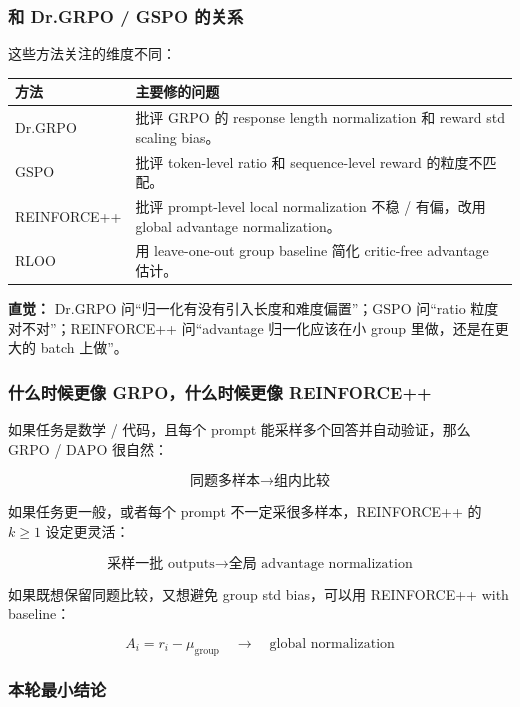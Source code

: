 \subsubsection{和 Dr.GRPO / GSPO 的关系}

这些方法关注的维度不同：

\begin{center}
{\small
\begin{tabular}{p{3cm}p{9.5cm}}
\hline
\textbf{方法} & \textbf{主要修的问题} \\
\hline
Dr.GRPO
&
批评 GRPO 的 response length normalization 和 reward std scaling bias。
\\
GSPO
&
批评 token-level ratio 和 sequence-level reward 的粒度不匹配。
\\
REINFORCE++
&
批评 prompt-level local normalization 不稳 / 有偏，改用 global advantage normalization。
\\
RLOO
&
用 leave-one-out group baseline 简化 critic-free advantage 估计。
\\
\hline
\end{tabular}
}
\end{center}

\begin{intubox}
\textbf{直觉：} Dr.GRPO 问“归一化有没有引入长度和难度偏置”；GSPO 问“ratio 粒度对不对”；REINFORCE++ 问“advantage 归一化应该在小 group 里做，还是在更大的 batch 上做”。
\end{intubox}

\subsubsection{什么时候更像 GRPO，什么时候更像 REINFORCE++}

如果任务是数学 / 代码，且每个 prompt 能采样多个回答并自动验证，那么 GRPO / DAPO 很自然：

\[
\text{同题多样本}
\to
\text{组内比较}
\]

如果任务更一般，或者每个 prompt 不一定采很多样本，REINFORCE++ 的 $k\ge 1$ 设定更灵活：

\[
\text{采样一批 outputs}
\to
\text{全局 advantage normalization}
\]

如果既想保留同题比较，又想避免 group std bias，可以用 REINFORCE++ with baseline：

\[
A_i = r_i-\mu_\text{group}
\quad
\to
\quad
\text{global normalization}
\]

\subsubsection{本轮最小结论}

